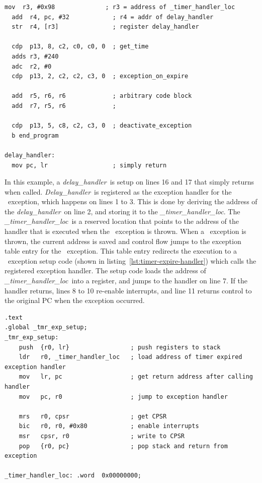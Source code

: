 \begin{lstlisting}[float=h, label=lst:exception-sample,caption=Sample code that triggers a \timerexpired\ exception ]
  mov  r3, #0x98              ; r3 = address of _timer_handler_loc 
  add  r4, pc, #32            ; r4 = addr of delay_handler
  str  r4, [r3]               ; register delay_handler
  
  cdp  p13, 8, c2, c0, c0, 0  ; get_time
  adds r3, #240
  adc  r2, #0
  cdp  p13, 2, c2, c2, c3, 0  ; exception_on_expire
  
  add  r5, r6, r6             ; arbitrary code block
  add  r7, r5, r6             ;
  
  cdp  p13, 5, c8, c2, c3, 0  ; deactivate_exception
  b end_program                       
  
delay_handler:
  mov pc, lr                  ; simply return
\end{lstlisting}

\newcommand{\delayhandler}{\emph{delay\_handler}}
\newcommand{\Delayhandler}{\emph{Delay\_handler}}
\newcommand{\timerhandlerloc}{\emph{\_timer\_handler\_loc}}

In this example, a \delayhandler\ is setup on lines 16 and 17 that simply returns when called.
\Delayhandler\ is registered as the exception handler for the \timerexpired\ exception, which happens on lines 1 to 3.
This is done by deriving the address of the \delayhandler\ on line 2, and storing it to the \timerhandlerloc.
The \timerhandlerloc\ is a reserved location that points to the address of the handler that is executed when the \timerexpired\ exception is thrown.
When a \timerexpired\ exception is thrown, the current address is saved and control flow jumps to the exception table entry for the \timerexpired\ exception.
This table entry redirects the execution to a \timerexpired\ exception setup code (shown in listing~\ref{lst:timer-expire-handler}) which calls the registered exception handler.
The setup code loads the address of \timerhandlerloc\ into a register, and jumps to the handler on line 7.
If the handler returns, lines 8 to 10 re-enable interrupts, and line 11 returns control to the original PC when the exception occurred.  
\begin{lstlisting}[float=h, label=lst:timer-expire-handler,caption=The \timerexpired\ exception setup code]
.text
.global _tmr_exp_setup;
_tmr_exp_setup:
    push  {r0, lr}                 ; push registers to stack
    ldr   r0, _timer_handler_loc   ; load address of timer expired exception handler
    mov   lr, pc                   ; get return address after calling handler    
    mov   pc, r0                   ; jump to exception handler
    
    mrs   r0, cpsr                 ; get CPSR 
    bic   r0, r0, #0x80            ; enable interrupts
    msr   cpsr, r0                 ; write to CPSR
    pop   {r0, pc}                 ; pop stack and return from exception

_timer_handler_loc: .word  0x00000000;
\end{lstlisting}

